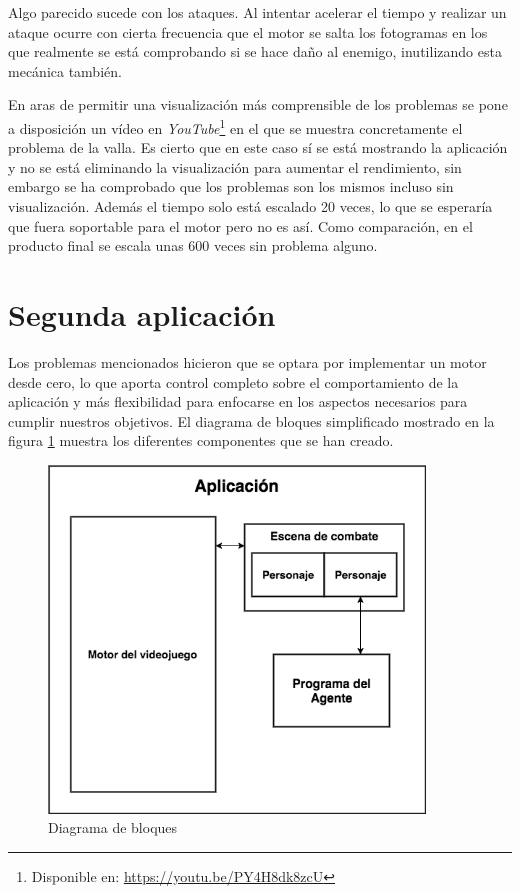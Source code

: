 \bigskip

Algo parecido sucede con los ataques. Al intentar acelerar el tiempo y realizar un ataque ocurre con cierta frecuencia que el motor se salta los fotogramas en los que realmente se está comprobando si se hace daño al enemigo, inutilizando esta mecánica también.

\bigskip

En aras de permitir una visualización más comprensible de los problemas se pone a disposición un vídeo en \textit{YouTube}\footnote{Disponible en: \url{https://youtu.be/PY4H8dk8zcU}} en el que se muestra concretamente el problema de la valla. Es cierto que en este caso sí se está mostrando la aplicación y no se está eliminando la visualización para aumentar el rendimiento, sin embargo se ha comprobado que los problemas son los mismos incluso sin visualización. Además el tiempo solo está escalado 20 veces, lo que se esperaría que fuera soportable para el motor pero no es así. Como comparación, en el producto final se escala unas 600 veces sin problema alguno.

\section{Segunda aplicación}

Los problemas mencionados hicieron que se optara por implementar un motor desde cero, lo que aporta control completo sobre el comportamiento de la aplicación y más flexibilidad para enfocarse en los aspectos necesarios para cumplir nuestros objetivos. El diagrama de bloques simplificado mostrado en la figura \ref{bloques} muestra los diferentes componentes que se han creado.

\bigskip

\begin{figure}
	\centerline{\includegraphics[width=10cm]{otros/otrasCapturas/block.png}}
	\caption{Diagrama de bloques}
	\label{bloques}
\end{figure}


